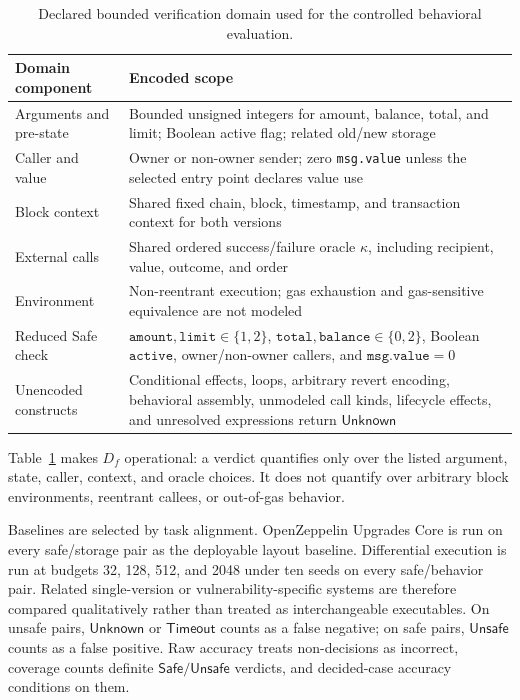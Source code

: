 \documentclass[runningheads]{llncs}
\newcommand{\Safe}{\mathsf{Safe}}
\newcommand{\Unsafe}{\mathsf{Unsafe}}
\newcommand{\Unknown}{\mathsf{Unknown}}
\newcommand{\Timeout}{\mathsf{Timeout}}
\begin{document}
\begin{table}[t]
\caption{Declared bounded verification domain used for the controlled behavioral evaluation.}
\label{tab:verification-domain}
\centering
\scriptsize
\begin{tabular}{@{}>{\raggedright\arraybackslash}m{}>{\raggedright\arraybackslash}m{}@{}}
\toprule
Domain component & Encoded scope \\
\midrule
Arguments and pre-state & Bounded unsigned integers for amount, balance, total, and limit; Boolean active flag; related old/new storage \\
Caller and value & Owner or non-owner sender; zero \texttt{msg.value} unless the selected entry point declares value use \\
Block context & Shared fixed chain, block, timestamp, and transaction context for both versions \\
External calls & Shared ordered success/failure oracle \(\kappa\), including recipient, value, outcome, and order \\
Environment & Non-reentrant execution; gas exhaustion and gas-sensitive equivalence are not modeled \\
Reduced Safe check & \(\texttt{amount},\texttt{limit}\in\{1,2\}\), \(\texttt{total},\texttt{balance}\in\{0,2\}\), Boolean \(\texttt{active}\), owner/non-owner callers, and \(\texttt{msg.value}=0\) \\
Unencoded constructs & Conditional effects, loops, arbitrary revert encoding, behavioral assembly, unmodeled call kinds, lifecycle effects, and unresolved expressions return \(\Unknown\) \\
\bottomrule
\end{tabular}
\end{table}

Table~\ref{tab:verification-domain} makes \(D_f\) operational: a verdict quantifies only over the listed argument, state, caller, context, and oracle choices. It does not quantify over arbitrary block environments, reentrant callees, or out-of-gas behavior.

Baselines are selected by task alignment. OpenZeppelin Upgrades Core is run on every safe/storage pair as the deployable layout baseline. Differential execution is run at budgets 32, 128, 512, and 2048 under ten seeds on every safe/behavior pair. Related single-version or vulnerability-specific systems are therefore compared qualitatively rather than treated as interchangeable executables. On unsafe pairs, \(\Unknown\) or \(\Timeout\) counts as a false negative; on safe pairs, \(\Unsafe\) counts as a false positive. Raw accuracy treats non-decisions as incorrect, coverage counts definite \(\Safe/\Unsafe\) verdicts, and decided-case accuracy conditions on them.
\end{document}
